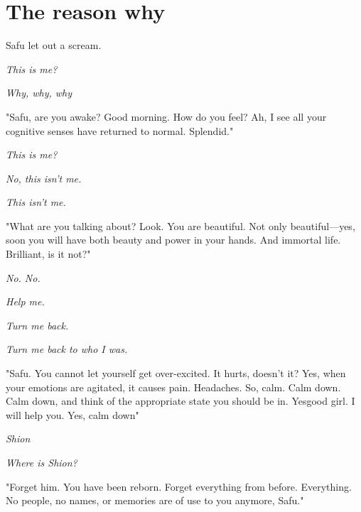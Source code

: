 
\chapter{The reason why}


Safu let out a scream.

\emph{This is me?}

\emph{Why, why, why\el }

"Safu, are you awake? Good morning. How do you feel? Ah, I see all your
cognitive senses have returned to normal. Splendid."

\emph{This is me?}

\emph{No, this isn't me.}

\emph{This isn't me.}

"What are you talking about? Look. You are beautiful. Not only
beautiful---yes, soon you will have both beauty and power in your hands.
And immortal life. Brilliant, is it not?"

\emph{No. No.}

\emph{Help me.}

\emph{Turn me back.}

\emph{Turn me back to who I was.}

"Safu. You cannot let yourself get over-excited. It hurts, doesn't it?
Yes, when your emotions are agitated, it causes pain. Headaches. So,
calm. Calm down. Calm down, and think of the appropriate state you
should be in. Yes\el good girl. I will help you. Yes, calm down\el "

\emph{Shion\el }

\emph{Where is Shion?}

"Forget him. You have been reborn. Forget everything from before.
Everything. No people, no names, or memories are of use to you anymore,
Safu."

